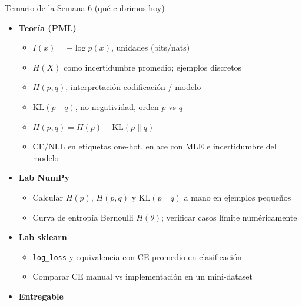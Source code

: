 \begin{frame}{Temario de la Semana 6 (qué cubrimos hoy)}
\begin{itemize}
  \item \textbf{Teoría (PML)}
  \begin{itemize}\small
    \item {} \(I(x)=-\log p(x)\), unidades (bits/nats) \hfill {}
    \item {} \(H(X)\) como incertidumbre promedio; ejemplos discretos \hfill {}
    \item {} \(H(p,q)\), interpretación codificación / modelo \hfill {}
    \item {} \(\mathrm{KL}(p\|q)\), no-negatividad, orden \(p\) vs \(q\) \hfill {}
    \item {} \(H(p,q)=H(p)+\mathrm{KL}(p\|q)\) \hfill {}
    \item {} CE/NLL en etiquetas one-hot, enlace con MLE e incertidumbre del modelo \hfill {}
  \end{itemize}
  \item \textbf{Lab NumPy}
  \begin{itemize}\small
    \item Calcular \(H(p)\), \(H(p,q)\) y \(\mathrm{KL}(p\|q)\) a mano en ejemplos pequeños
    \item Curva de entropía Bernoulli \(H(\theta)\); verificar casos límite numéricamente
  \end{itemize}
  \item \textbf{Lab sklearn}
  \begin{itemize}\small
    \item \texttt{log\_loss} y equivalencia con CE promedio en clasificación
    \item Comparar CE manual vs implementación en un mini-dataset
  \end{itemize}
  \item \textbf{Entregable}
\end{itemize}
\end{frame}

